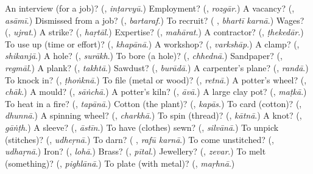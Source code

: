 \begin{tcolorbox}[breakable,colback=teal!4,colframe=teal!35!black,title={Before you move on}]
An interview (for a job)? (\textbf{}, \emph{inṭarvyū}.) Employment? (\textbf{}, \emph{rozgār}.) A vacancy? (\textbf{}, \emph{asāmī}.) Dismissed from a job? (\textbf{}, \emph{bartaraf}.) To recruit? (\textbf{ }, \emph{bhartī karnā}.) Wages? (\textbf{}, \emph{ujrat}.) A strike? (\textbf{}, \emph{haṛtāl}.) Expertise? (\textbf{}, \emph{mahārat}.) A contractor? (\textbf{}, \emph{ṭhekedār}.) To use up (time or effort)? (\textbf{}, \emph{khapānā}.) A workshop? (\textbf{}, \emph{varkshāp}.) A clamp? (\textbf{}, \emph{shikanjā}.) A hole? (\textbf{}, \emph{surākh}.) To bore (a hole)? (\textbf{}, \emph{chhednā}.) Sandpaper? (\textbf{}, \emph{regmāl}.) A plank? (\textbf{}, \emph{takhtā}.) Sawdust? (\textbf{}, \emph{burādā}.) A carpenter's plane? (\textbf{}, \emph{randā}.) To knock in? (\textbf{}, \emph{ṭhoṅknā}.) To file (metal or wood)? (\textbf{}, \emph{retnā}.) A potter's wheel? (\textbf{}, \emph{chāk}.) A mould? (\textbf{}, \emph{sāṅchā}.) A potter's kiln? (\textbf{}, \emph{āvā}.) A large clay pot? (\textbf{}, \emph{maṭkā}.) To heat in a fire? (\textbf{}, \emph{tapānā}.) Cotton (the plant)? (\textbf{}, \emph{kapās}.) To card (cotton)? (\textbf{}, \emph{dhunnā}.) A spinning wheel? (\textbf{}, \emph{charkhā}.) To spin (thread)? (\textbf{}, \emph{kātnā}.) A knot? (\textbf{}, \emph{gāṅṭh}.) A sleeve? (\textbf{}, \emph{āstīn}.) To have (clothes) sewn? (\textbf{}, \emph{silvānā}.) To unpick (stitches)? (\textbf{}, \emph{udheṛnā}.) To darn? (\textbf{ }, \emph{rafū karnā}.) To come unstitched? (\textbf{}, \emph{udhaṛnā}.) Iron? (\textbf{}, \emph{lohā}.) Brass? (\textbf{}, \emph{pītal}.) Jewellery? (\textbf{}, \emph{zevar}.) To melt (something)? (\textbf{}, \emph{pighlānā}.) To plate (with metal)? (\textbf{}, \emph{maṛhnā}.)
\end{tcolorbox}
